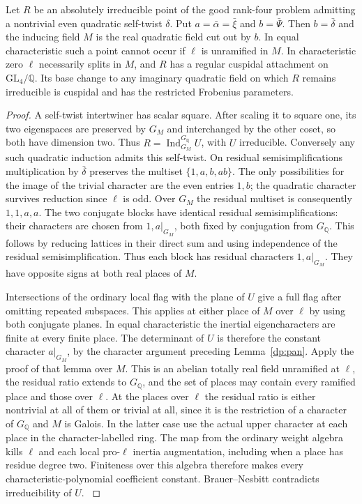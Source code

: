 \begin{proposition}\label{hr:ind}
Let \(R\) be an absolutely irreducible point of the good rank-four
problem admitting a nontrivial even quadratic self-twist \(\delta\).
Put \(a=\bar\alpha=\bar\xi\) and \(b=\bar\Psi\). Then \(b=\bar\delta\)
and the inducing field \(M\) is the real quadratic field cut out by
\(b\). In equal characteristic such a point cannot occur if
\(\ell\) is unramified in \(M\). In characteristic zero \(\ell\)
necessarily splits in \(M\), and \(R\) has a regular cuspidal
attachment on \(\mathrm{GL}_4/\mathbb Q\). Its base change to any
imaginary quadratic field on which \(R\) remains irreducible is
cuspidal and has the restricted Frobenius parameters.
\end{proposition}
\begin{proof}
A self-twist intertwiner has scalar square. After scaling it to
square one, its two eigenspaces are preserved by \(G_M\) and
interchanged by the other coset, so both have dimension two. Thus
\(R=\operatorname{Ind}_{G_M}^{G_{\mathbb Q}}U\), with \(U\)
irreducible. Conversely any such quadratic induction admits this
self-twist. On residual semisimplifications multiplication by
\(\bar\delta\) preserves the multiset \(\{1,a,b,ab\}\).
The only possibilities for the image of the trivial character are
the even entries \(1,b\); the quadratic character survives
reduction since \(\ell\) is odd. Over \(G_M\) the residual multiset
is consequently \(1,1,a,a\). The two conjugate blocks have
identical residual semisimplifications: their characters are
chosen from \(1,a|_{G_M}\), both fixed by conjugation from
\(G_{\mathbb Q}\). This follows by reducing lattices in their
direct sum and using independence of the residual semisimplification.
Thus each block has residual characters \(1,a|_{G_M}\).
They have opposite signs at both real places of \(M\).

Intersections of the ordinary local flag with the plane of \(U\)
give a full flag after omitting repeated subspaces. This applies
at either place of \(M\) over \(\ell\) by using both conjugate
planes. In equal characteristic the inertial eigencharacters are
finite at every finite place. The determinant of \(U\) is therefore
the constant character \(a|_{G_M}\), by the character argument
preceding Lemma~\ref{dp:pan}. Apply the proof of that lemma over
\(M\). This is an abelian totally real field unramified at
\(\ell\), the residual ratio extends to \(G_{\mathbb Q}\), and
the set of places may contain every ramified place and those over
\(\ell\). At the places over \(\ell\) the residual ratio is either
nontrivial at all of them or trivial at all, since it is the
restriction of a character of \(G_{\mathbb Q}\) and \(M\) is
Galois. In the latter case use the actual upper character at each
place in the character-labelled ring. The map from the ordinary
weight algebra kills \(\ell\) and each local pro-\(\ell\) inertia
augmentation, including when a place has residue degree two.
Finiteness over this algebra therefore makes every
characteristic-polynomial coefficient constant. Brauer--Nesbitt
contradicts irreducibility of \(U\).
\cite[Theorems~5.1.1(1) and~6.1.1(1)]{panFM}


\end{proof}

